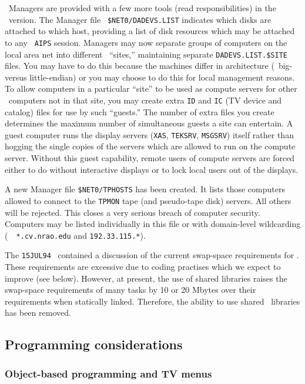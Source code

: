      \AIPS\ Managers are provided with a few more tools (read
responsibilities) in the \RELEASENAME\ version.  The Manager file {\tt
\$NET0/DADEVS.LIST} indicates which disks are attached to which host,
providing a list of disk resources which may be attached to any {\tt
AIPS} session.  Managers may now separate groups of computers on the
local area net into different \AIPS\ ``sites,''  maintaining separate
{\tt DADEVS.LIST.\$SITE} files.  You may have to do this because the
machines differ in architecture (\ie\ big- versus little-endian) or
you may choose to do this for local management reasons.  To allow
computers in a particular ``site'' to be used as compute servers for
other \AIPS\ computers not in that site, you may create extra {\tt ID}
and {\tt IC} (TV device and catalog) files for use by such ``guests.''
The number of extra files you create determines the maximum number of
simultaneous guests a site can entertain.  A guest computer runs the
display servers ({\tt XAS}, {\tt TEKSRV}, {\tt MSGSRV}) itself rather
than hogging the single copies of the servers which are allowed to run
on the compute server.  Without this guest capability, remote users of
compute servers are forced either to do without interactive displays
or to lock local users out of the displays.

     A new Manager file {\tt \$NET0/TPHOSTS} has been created.  It
lists those computers allowed to connect to the {\tt TPMON} tape (and
pseudo-tape disk) servers.  All others will be rejected.  This closes
a very serious breach of computer security.  Computers may be listed
individually in this file or with domain-level wildcarding (\eg\ {\tt
*.cv.nrao.edu} and {\tt 192.33.115.*}).

     The {\tt 15JUL94} \Aipsletter\ contained a discussion of the
current swap-space requirements for \hbox{\AIPS}.  These requirements
are excessive due to coding practises which we expect to improve (see
below).  However, at present, the use of shared libraries raises the
swap-space requirements of many tasks by 10 or 20 Mbytes over their
requirements when statically linked.  Therefore, the ability to use
shared \AIPS\ libraries has been removed.

\subsection{Programming considerations}

\subsubsection{Object-based programming and TV menus}

